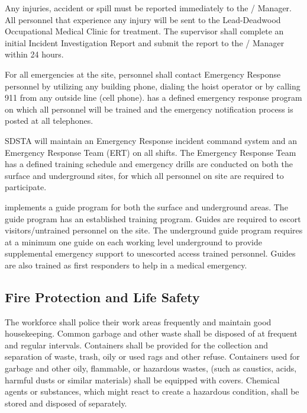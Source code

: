 Any injuries, accident or spill must be reported immediately to the
/  Manager. All personnel that
experience any injury will be sent to the Lead-Deadwood Occupational
Medical Clinic for treatment. The supervisor shall complete an initial Incident
Investigation Report and submit the report to the
/  Manager within 24 hours.

For all emergencies at the  site, personnel shall contact
Emergency Response personnel by utilizing any building phone, dialing
the hoist operator or by calling 911 from any outside line (cell
phone).   has a defined emergency response program on which all
personnel will be trained and the emergency notification process is
posted at all telephones.

SDSTA will maintain an Emergency Response incident command system
and an Emergency Response Team (ERT) on all shifts. The Emergency
Response Team has a defined training schedule and emergency drills are
conducted on both the surface and underground sites, for which all
personnel on site are required to participate.

 implements a guide program for both the surface and underground
areas. The guide program has an established training program. Guides
are required to escort visitors/untrained personnel on the 
site. The underground guide program requires at a minimum one guide on
each working level underground to provide supplemental emergency
support to unescorted access trained personnel. Guides are also
trained as first responders to help in a medical emergency.

\subsection{Fire Protection and Life Safety}

The workforce shall police their work areas frequently and maintain
good housekeeping. Common garbage and other waste shall be disposed of
at frequent and regular intervals.  Containers shall be provided for
the collection and separation of waste, trash, oily or used rags and
other refuse.  Containers used for garbage and other oily, flammable,
or hazardous wastes, (such as caustics, acids, harmful dusts or
similar materials) shall be equipped with covers.  Chemical agents or
substances, which might react to create a hazardous condition, shall
be stored and disposed of separately.

